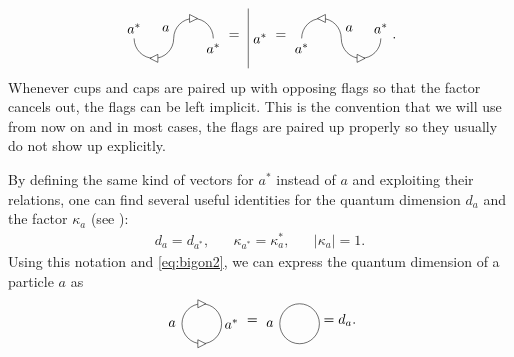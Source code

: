 	\begin{equation}
		\begin{tikzpicture}[baseline=(current bounding box.center)]
			\draw (0,0) arc (180:0:0.5);
			\draw[fill=white] (0.6,0.5) -- (0.4,0.4) -- (0.4,0.6) -- cycle;
			\draw (0,0) arc (0:-180:0.5);
			\draw[fill=white] (-0.6,-0.5) -- (-0.4,-0.6) -- (-0.4,-0.4) -- cycle;
			\node at (-0.2,0.25) {$a$};
			\node at (1,-0.25) {$a^*$};
			\node at (-1,0.25) {$a^*$};
		\end{tikzpicture}=\ 
		\begin{tikzpicture}[baseline=(current bounding box.center)]
			\draw (0,-0.75) to node[right] {$a^*$} (0,0.75);
		\end{tikzpicture}=
		\begin{tikzpicture}[baseline=(current bounding box.center),yscale=-1]
			\draw (0,0) arc (180:0:0.5);
			\draw[fill=white] (0.6,0.5) -- (0.4,0.4) -- (0.4,0.6) -- cycle;
			\draw (0,0) arc (0:-180:0.5);
			\draw[fill=white] (-0.6,-0.5) -- (-0.4,-0.6) -- (-0.4,-0.4) -- cycle;
			\node at (0.2,-0.25) {$a$};
			\node at (1,-0.25) {$a^*$};
			\node at (-1,0.25) {$a^*$};
		\end{tikzpicture}.
	\end{equation}
Whenever cups and caps are paired up with opposing flags so that the factor cancels out, the flags can be left implicit. This is the convention that we will use from now on and in most cases, the flags are paired up properly so they usually do not show up explicitly.

By defining the same kind of vectors for $a^*$ instead of $a$ and exploiting their relations, one can find several useful identities for the quantum dimension $d_a$ and the factor $\kappa_a$ (see \cite[App.\ E]{kitaev_anyons_2006}):
	\begin{align}
		d_a=d_{a^*},\hspace{20pt}\kappa_{a^*}=\kappa_a^*,\hspace{20pt}|\kappa_a|=1.
	\end{align}
Using this notation and \cref{eq:bigon2}, we can express the quantum dimension of a particle $a$ as 	
	\begin{equation}
	\label{eq:qdimgraph}
		\begin{tikzpicture}[baseline=(current bounding box.center)]
			\draw (0,0) circle (0.5cm);
			\node at (0.75,0) {$a^*$};
			\node at (-0.75,0) {$a$};
			\draw[fill=white] (0.1,0.5) -- (-0.1,0.4) -- (-0.1,0.6) -- cycle;
			\draw[fill=white] (0.1,-0.5) -- (-0.1,-0.4) -- (-0.1,-0.6) -- cycle;
		\end{tikzpicture}=
		\begin{tikzpicture}[baseline=(current bounding box.center)]
			\draw (0,0) circle (0.5cm);
			\node at (-0.75,0) {$a$};
		\end{tikzpicture}
		=d_a.
	\end{equation}

